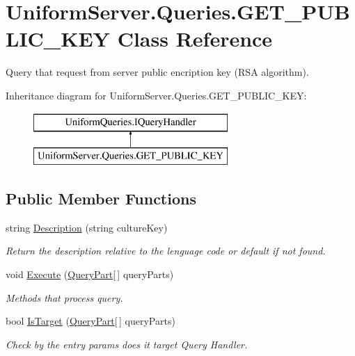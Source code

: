 \hypertarget{class_uniform_server_1_1_queries_1_1_g_e_t___p_u_b_l_i_c___k_e_y}{}\section{Uniform\+Server.\+Queries.\+G\+E\+T\+\_\+\+P\+U\+B\+L\+I\+C\+\_\+\+K\+EY Class Reference}
\label{class_uniform_server_1_1_queries_1_1_g_e_t___p_u_b_l_i_c___k_e_y}


Query that request from server public encription key (R\+SA algorithm).  


Inheritance diagram for Uniform\+Server.\+Queries.\+G\+E\+T\+\_\+\+P\+U\+B\+L\+I\+C\+\_\+\+K\+EY\+:\begin{figure}[H]
\begin{center}
\leavevmode
\includegraphics[height=2.000000cm]{da/d43/class_uniform_server_1_1_queries_1_1_g_e_t___p_u_b_l_i_c___k_e_y}
\end{center}
\end{figure}
\subsection*{Public Member Functions}
\begin{DoxyCompactItemize}
\item 
string \mbox{\hyperlink{class_uniform_server_1_1_queries_1_1_g_e_t___p_u_b_l_i_c___k_e_y_aee414e6882494609ed576f061d662dc2}{Description}} (string culture\+Key)
\begin{DoxyCompactList}\small\item\em Return the description relative to the lenguage code or default if not found. \end{DoxyCompactList}\item 
void \mbox{\hyperlink{class_uniform_server_1_1_queries_1_1_g_e_t___p_u_b_l_i_c___k_e_y_a63367fa9543a3fb4a1126373a833c317}{Execute}} (\mbox{\hyperlink{struct_uniform_queries_1_1_query_part}{Query\+Part}}\mbox{[}$\,$\mbox{]} query\+Parts)
\begin{DoxyCompactList}\small\item\em Methods that process query. \end{DoxyCompactList}\item 
bool \mbox{\hyperlink{class_uniform_server_1_1_queries_1_1_g_e_t___p_u_b_l_i_c___k_e_y_ae27d462fe9ccbbf22ac03c9ead9cbe8f}{Is\+Target}} (\mbox{\hyperlink{struct_uniform_queries_1_1_query_part}{Query\+Part}}\mbox{[}$\,$\mbox{]} query\+Parts)
\begin{DoxyCompactList}\small\item\em Check by the entry params does it target Query Handler. \end{DoxyCompactList}\end{DoxyCompactItemize}


